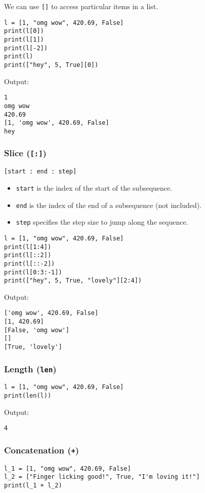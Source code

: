\documentclass[11pt]{article}
\begin{document}
We can use \texttt{[]} to access particular items in a list.
\begin{verbatim}
l = [1, "omg wow", 420.69, False]
print(l[0])
print(l[1])
print(l[-2])
print(l)
print(["hey", 5, True][0])
\end{verbatim}

 \noindent Output:

\label{org34e6d5a}
\begin{verbatim}
1
omg wow
420.69
[1, 'omg wow', 420.69, False]
hey
\end{verbatim}


 \newpage
\subsubsection{Slice (\texttt{[:]})}
\label{sec:org1ad70bf}
\texttt{[start : end : step]}
\begin{itemize}
\item \texttt{start} is the index of the start of the subsequence.
\item \texttt{end} is the index of the end of a subsequence (not included).
\item \texttt{step} specifies the step size to jump along the sequence.
\end{itemize}

\begin{verbatim}
l = [1, "omg wow", 420.69, False]
print(l[1:4])
print(l[::2])
print(l[::-2])
print(l[0:3:-1])
print(["hey", 5, True, "lovely"][2:4])
\end{verbatim}

 \noindent Output:

\label{org3e82ca8}
\begin{verbatim}
['omg wow', 420.69, False]
[1, 420.69]
[False, 'omg wow']
[]
[True, 'lovely']
\end{verbatim}
\subsubsection{Length (\texttt{len})}
\label{sec:org5013153}
\begin{verbatim}
l = [1, "omg wow", 420.69, False]
print(len(l))
\end{verbatim}

 \noindent Output:

\label{org0db809a}
\begin{verbatim}
4
\end{verbatim}
\subsubsection{Concatenation (\texttt{+})}
\label{sec:orgb6dfc6d}
\begin{verbatim}
l_1 = [1, "omg wow", 420.69, False]
l_2 = ["Finger licking good!", True, "I'm loving it!"]
print(l_1 + l_2)
\end{verbatim}
\end{document}
